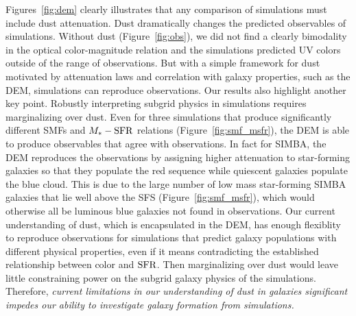 Figures~\ref{fig:dem} clearly illustrates that any comparison of simulations 
must include dust attenuation. Dust dramatically changes the predicted 
observables of simulations. Without dust (Figure~\ref{fig:obs}), we did 
not find a clearly bimodality in the optical color-magnitude relation and
the simulations predicted UV colors outside of the range of observations.
But with a simple framework for dust motivated by attenuation laws and 
correlation with galaxy properties, such as the DEM, simulations can 
reproduce observations. Our results also highlight another key point. Robustly interpreting subgrid
physics in simulations requires marginalizing over dust. Even for three
simulations that produce significantly different SMFs and $M_*-{\rm SFR}$ relations
(Figure~\ref{fig:smf_msfr}), the DEM is able to produce observables that agree
with observations. In fact for SIMBA, the DEM reproduces the observations by assigning
higher attenuation to star-forming galaxies so that they populate the red sequence 
while quiescent galaxies populate the blue cloud. This is due to the large
number of low mass star-forming SIMBA galaxies that lie well above the SFS
(Figure~\ref{fig:smf_msfr}), which would otherwise all be luminous blue
galaxies not found in observations. Our current understanding of dust, which is
encapsulated in the DEM, has enough flexiblity to reproduce observations 
for simulations that predict galaxy populations with different physical
properties, even if it means contradicting the established relationship 
between color and ${\rm SFR}$. Then marginalizing over dust would leave little 
constraining power on the subgrid galaxy physics of the simulations. 
Therefore, \emph{current limitations in our understanding of dust in 
galaxies significant impedes our ability to investigate galaxy 
formation from simulations.}

